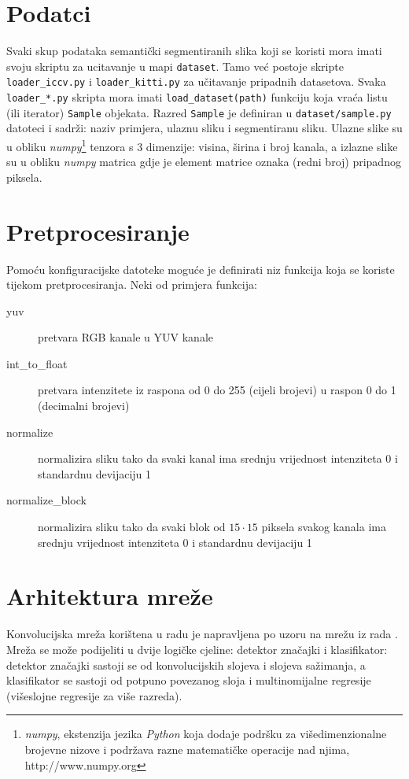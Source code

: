 \documentclass[times, utf8, diplomski, numeric]{fer}
\begin{document}
\section{Podatci}
Svaki skup podataka semantički segmentiranih slika koji se koristi mora imati svoju skriptu za ucitavanje u mapi \texttt{dataset}. Tamo već postoje skripte \texttt{loader\_iccv.py} i \texttt{loader\_kitti.py} za učitavanje pripadnih datasetova. Svaka \texttt{loader\_*.py} skripta mora imati \texttt{load\_dataset(path)} funkciju koja vraća listu (ili iterator) \texttt{Sample} objekata. Razred \texttt{Sample} je definiran u \texttt{dataset/sample.py} datoteci i sadrži: naziv primjera, ulaznu sliku i segmentiranu sliku. Ulazne slike su u obliku \emph{numpy}\footnote{\textit{numpy}, ekstenzija jezika \textit{Python} koja dodaje podršku za višedimenzionalne brojevne nizove i podržava razne matematičke operacije nad njima, http://www.numpy.org} tenzora s 3 dimenzije: visina, širina i broj kanala, a izlazne slike su u obliku \emph{numpy} matrica gdje je element matrice oznaka (redni broj) pripadnog piksela.

\section{Pretprocesiranje}
Pomoću konfiguracijske datoteke moguće je definirati niz funkcija koja se koriste tijekom pretprocesiranja. Neki od primjera funkcija:
\begin{description}
  \item[yuv] pretvara RGB kanale u YUV kanale
  \item[int\_to\_float] pretvara intenzitete iz raspona od 0 do 255 (cijeli brojevi) u raspon 0 do 1 (decimalni brojevi)
  \item[normalize] normalizira sliku tako da svaki kanal ima srednju vrijednost intenziteta 0 i standardnu devijaciju 1
  \item[normalize\_block] normalizira sliku tako da svaki blok od $15 \cdot 15$ piksela svakog kanala ima srednju vrijednost intenziteta 0 i standardnu devijaciju 1
\end{description}


\section{Arhitektura mreže}
\label{chap:net_architecture}

Konvolucijska mreža korištena u radu je napravljena po uzoru na mrežu iz rada \cite{farabet_pami}. Mreža se može podijeliti u dvije logičke cjeline: detektor značajki i klasifikator: detektor značajki sastoji se od konvolucijskih slojeva i slojeva sažimanja, a klasifikator se sastoji od potpuno povezanog sloja i multinomijalne regresije (višeslojne regresije za više razreda).
\end{document}
